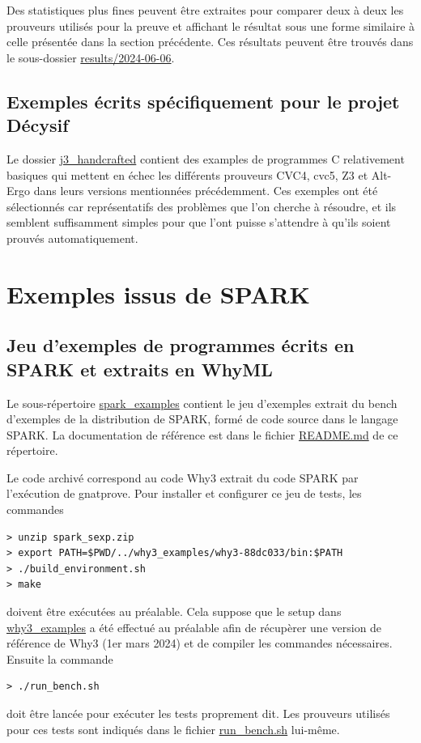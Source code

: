 \documentclass[a4paper,11pt]{article}
\begin{document}
Des statistiques plus fines peuvent être extraites pour comparer deux à deux
les prouveurs utilisés pour la preuve et affichant le résultat sous une forme
similaire à celle présentée dans la section précédente. Ces résultats peuvent
être trouvés dans le sous-dossier \url{results/2024-06-06}.

\subsection{Exemples écrits spécifiquement pour le projet Décysif}

Le dossier \url{j3_handcrafted} contient des examples de programmes C
relativement basiques qui mettent en échec les différents prouveurs CVC4, cvc5,
Z3 et Alt-Ergo dans leurs versions mentionnées précédemment.
Ces exemples ont été sélectionnés car représentatifs des problèmes que l'on
cherche à résoudre, et ils semblent suffisamment simples pour que l'ont puisse
s'attendre à qu'ils soient prouvés automatiquement.

\section{Exemples issus de SPARK}

\subsection{Jeu d'exemples de programmes écrits en SPARK et extraits en WhyML}

Le sous-répertoire \url{spark_examples} contient le jeu d'exemples extrait du
bench d'exemples de la distribution de SPARK, formé de code source dans le
langage SPARK. La documentation de référence est dans le fichier
\url{README.md} de ce répertoire.

Le code archivé correspond au code Why3 extrait du code SPARK par l'exécution
de gnatprove. Pour installer et configurer ce jeu de tests, les commandes
\begin{lstlisting}
> unzip spark_sexp.zip
> export PATH=$PWD/../why3_examples/why3-88dc033/bin:$PATH
> ./build_environment.sh
> make
\end{lstlisting}
doivent être exécutées au préalable. Cela suppose que le setup dans \url{why3_examples}
a été effectué au préalable afin de récupèrer une version de
référence de Why3 (1er mars 2024) et de compiler les commandes nécessaires. Ensuite la commande
\begin{lstlisting}
> ./run_bench.sh
\end{lstlisting}
doit être lancée pour exécuter les tests proprement dit. Les prouveurs
utilisés pour ces tests sont indiqués dans le fichier
\url{run_bench.sh} lui-même.
\end{document}
